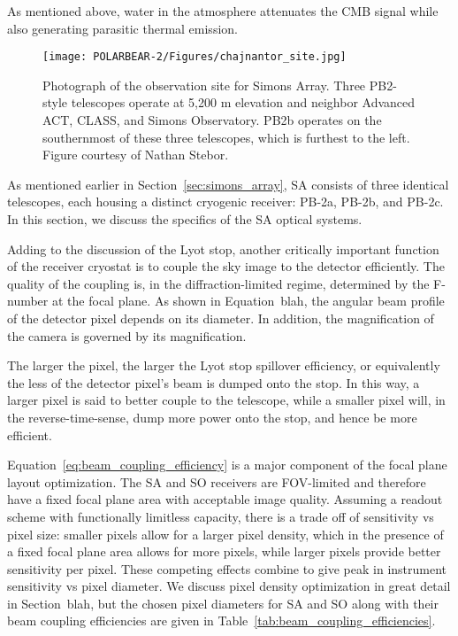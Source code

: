 
As mentioned above, water in the atmosphere attenuates the CMB signal while also generating parasitic thermal emission. 

\begin{figure}
    \centering
    \texttt{[image: POLARBEAR-2/Figures/chajnantor\_site.jpg]}
    \caption[Chajnantor observation site]{Photograph of the observation site for Simons Array. Three PB2-style telescopes operate at 5,200 m elevation and neighbor Advanced ACT, CLASS, and Simons Observatory. PB2b operates on the southernmost of these three telescopes, which is furthest to the left. Figure courtesy of Nathan Stebor.}
    \label{fig:chajnantor_site}
\end{figure}

As mentioned earlier in Section~\ref{sec:simons_array}, SA consists of three identical telescopes, each housing a distinct cryogenic receiver: PB-2a, PB-2b, and PB-2c. In this section, we discuss the specifics of the SA optical systems. 

Adding to the discussion of the Lyot stop, another critically important function of the receiver cryostat is to couple the sky image to the detector efficiently. The quality of the coupling is, in the diffraction-limited regime, determined by the F-number at the focal plane. As shown in Equation~blah, the angular beam profile of the detector pixel depends on its diameter. In addition, the magnification of the camera is governed by its magnification. 

The larger the pixel, the larger the Lyot stop spillover efficiency, or equivalently the less of the detector pixel's beam is dumped onto the stop. In this way, a larger pixel is said to better couple to the telescope, while a smaller pixel will, in the reverse-time-sense, dump more power onto the stop, and hence be more efficient. 

Equation~\ref{eq:beam_coupling_efficiency} is a major component of the focal plane layout optimization. The SA and SO receivers are FOV-limited and therefore have a fixed focal plane area with acceptable image quality. Assuming a readout scheme with functionally limitless capacity, there is a trade off of sensitivity vs pixel size: smaller pixels allow for a larger pixel density, which in the presence of a fixed focal plane area allows for more pixels, while larger pixels provide better sensitivity per pixel. These competing effects combine to give peak in instrument sensitivity vs pixel diameter. We discuss pixel density optimization in great detail in Section~blah, but the chosen pixel diameters for SA and SO along with their beam coupling efficiencies are given in Table~\ref{tab:beam_coupling_efficiencies}.

